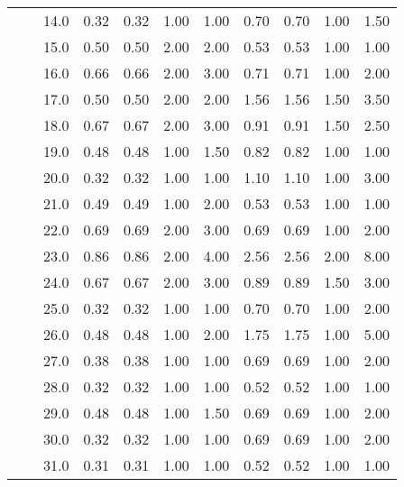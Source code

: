 \begin{tabular}{lllrrrrrrrr}
       &     & 14.0 &       0.32 &      0.32 &  1.00 &   1.00 &       0.70 &      0.70 &  1.00 &   1.50 \\
       &     & 15.0 &       0.50 &      0.50 &  2.00 &   2.00 &       0.53 &      0.53 &  1.00 &   1.00 \\
       &     & 16.0 &       0.66 &      0.66 &  2.00 &   3.00 &       0.71 &      0.71 &  1.00 &   2.00 \\
       &     & 17.0 &       0.50 &      0.50 &  2.00 &   2.00 &       1.56 &      1.56 &  1.50 &   3.50 \\
       &     & 18.0 &       0.67 &      0.67 &  2.00 &   3.00 &       0.91 &      0.91 &  1.50 &   2.50 \\
       &     & 19.0 &       0.48 &      0.48 &  1.00 &   1.50 &       0.82 &      0.82 &  1.00 &   1.00 \\
       &     & 20.0 &       0.32 &      0.32 &  1.00 &   1.00 &       1.10 &      1.10 &  1.00 &   3.00 \\
       &     & 21.0 &       0.49 &      0.49 &  1.00 &   2.00 &       0.53 &      0.53 &  1.00 &   1.00 \\
       &     & 22.0 &       0.69 &      0.69 &  2.00 &   3.00 &       0.69 &      0.69 &  1.00 &   2.00 \\
       &     & 23.0 &       0.86 &      0.86 &  2.00 &   4.00 &       2.56 &      2.56 &  2.00 &   8.00 \\
       &     & 24.0 &       0.67 &      0.67 &  2.00 &   3.00 &       0.89 &      0.89 &  1.50 &   3.00 \\
       &     & 25.0 &       0.32 &      0.32 &  1.00 &   1.00 &       0.70 &      0.70 &  1.00 &   2.00 \\
       &     & 26.0 &       0.48 &      0.48 &  1.00 &   2.00 &       1.75 &      1.75 &  1.00 &   5.00 \\
       &     & 27.0 &       0.38 &      0.38 &  1.00 &   1.00 &       0.69 &      0.69 &  1.00 &   2.00 \\
       &     & 28.0 &       0.32 &      0.32 &  1.00 &   1.00 &       0.52 &      0.52 &  1.00 &   1.00 \\
       &     & 29.0 &       0.48 &      0.48 &  1.00 &   1.50 &       0.69 &      0.69 &  1.00 &   2.00 \\
       &     & 30.0 &       0.32 &      0.32 &  1.00 &   1.00 &       0.69 &      0.69 &  1.00 &   2.00 \\
       &     & 31.0 &       0.31 &      0.31 &  1.00 &   1.00 &       0.52 &      0.52 &  1.00 &   1.00 \\

\end{tabular}
